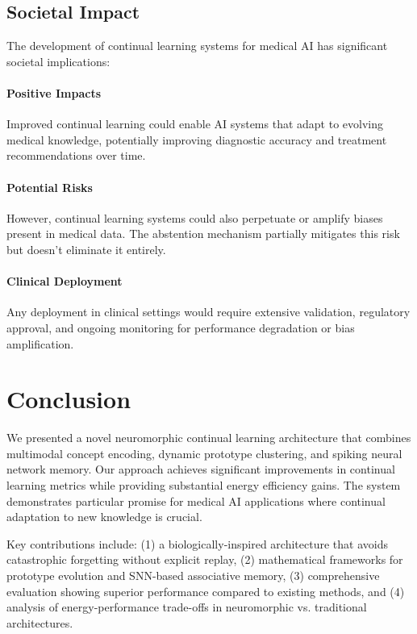 \documentclass{article}
\begin{document}
\subsection{Societal Impact}

The development of continual learning systems for medical AI has significant societal implications:

\paragraph{Positive Impacts} Improved continual learning could enable AI systems that adapt to evolving medical knowledge, potentially improving diagnostic accuracy and treatment recommendations over time.

\paragraph{Potential Risks} However, continual learning systems could also perpetuate or amplify biases present in medical data. The abstention mechanism partially mitigates this risk but doesn't eliminate it entirely.

\paragraph{Clinical Deployment} Any deployment in clinical settings would require extensive validation, regulatory approval, and ongoing monitoring for performance degradation or bias amplification.

\section{Conclusion}
\label{sec:conclusion}

We presented a novel neuromorphic continual learning architecture that combines multimodal concept encoding, dynamic prototype clustering, and spiking neural network memory. Our approach achieves significant improvements in continual learning metrics while providing substantial energy efficiency gains. The system demonstrates particular promise for medical AI applications where continual adaptation to new knowledge is crucial.

Key contributions include: (1) a biologically-inspired architecture that avoids catastrophic forgetting without explicit replay, (2) mathematical frameworks for prototype evolution and SNN-based associative memory, (3) comprehensive evaluation showing superior performance compared to existing methods, and (4) analysis of energy-performance trade-offs in neuromorphic vs. traditional architectures.
\end{document}
